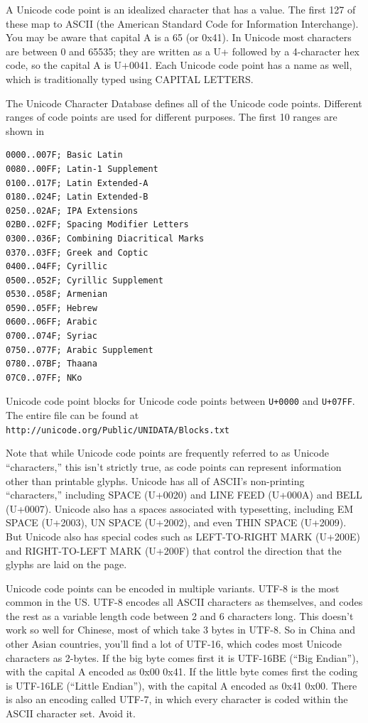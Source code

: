 A Unicode code point is an
idealized character that has a value. The first 127 of these map to
ASCII (the American Standard Code for Information Interchange). You
may be aware that capital A is a 65 (or 0x41). In Unicode most
characters are between 0 and 65535; they are written as a U+ followed
by a 4-character hex code, so the capital A is U+0041. Each Unicode
code point has a name as well, which is traditionally typed using
CAPITAL LETTERS.

The Unicode Character Database defines all of the Unicode code points. Different ranges of code points are used for different purposes. The first 10 ranges are shown in 
\begin{table}
\begin{Verbatim}
0000..007F; Basic Latin
0080..00FF; Latin-1 Supplement
0100..017F; Latin Extended-A
0180..024F; Latin Extended-B
0250..02AF; IPA Extensions
02B0..02FF; Spacing Modifier Letters
0300..036F; Combining Diacritical Marks
0370..03FF; Greek and Coptic
0400..04FF; Cyrillic
0500..052F; Cyrillic Supplement
0530..058F; Armenian
0590..05FF; Hebrew
0600..06FF; Arabic
0700..074F; Syriac
0750..077F; Arabic Supplement
0780..07BF; Thaana
07C0..07FF; NKo
\end{Verbatim}
\caption{Unicode code point blocks for Unicode code points between \texttt{U+0000} and \texttt{U+07FF}. The entire file can be found at \texttt{http://unicode.org/Public/UNIDATA/Blocks.txt}}\label{unicode-ranges}
\end{table}

Note that while Unicode code points are frequently referred to as Unicode
``characters,'' this isn't strictly true, as code points can represent
information other than printable glyphs. Unicode has all of ASCII's
non-printing ``characters,'' including SPACE (U+0020) and LINE
FEED (U+000A) and BELL (U+0007). Unicode also has a spaces associated
with typesetting, including EM SPACE (U+2003), UN SPACE (U+2002), and
even THIN SPACE (U+2009). But Unicode also has special codes such as 
LEFT-TO-RIGHT MARK (U+200E) and RIGHT-TO-LEFT MARK (U+200F) that
control the direction that the glyphs are laid on the page. 

Unicode code points can be encoded in multiple variants. UTF-8 is the
most common in the US. UTF-8 encodes all ASCII characters as
themselves, and codes the rest as a variable length code between 2 and
6 characters long. This doesn't work so well for Chinese, most of
which take 3 bytes in UTF-8.  So in China and other Asian countries,
you'll find a lot of UTF-16, which codes most Unicode characters as
2-bytes. If the big byte comes first it is UTF-16BE (``Big Endian''),
with the capital A encoded as 0x00 0x41. If the little byte comes
first the coding is UTF-16LE (``Little Endian''), with the capital A
encoded as 0x41 0x00. There is also an encoding called UTF-7, in which
every character is coded within the ASCII character set. Avoid it.

